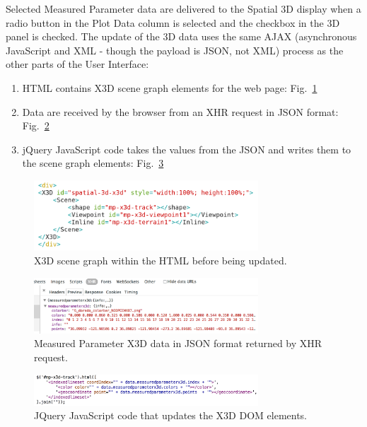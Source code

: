 \documentclass[conference]{IEEEtran}
\begin{document}
Selected Measured Parameter data are delivered to the Spatial 3D display when a radio button in the Plot Data column is selected and the checkbox in the 3D panel is checked. The update of the 3D data uses the same AJAX (asynchronous JavaScript and XML - though the payload is JSON, not XML) process as the other parts of the User Interface:

\begin{enumerate}
\item HTML contains X3D scene graph elements for the web page: Fig.~\ref{fig:Spatial3D_DOM}
\item Data are received by the browser from an XHR request in JSON format: Fig.~\ref{fig:JSONData}
\item jQuery JavaScript code takes the values from the JSON and writes them to the scene graph elements: Fig.~\ref{fig:jQueryDOMUpdateGeo}
\end{enumerate}

\begin{figure}[!htbp]
\centering
\includegraphics[width=3.3in]{Spatial3D_DOM.png}
\caption{X3D scene graph within the HTML before being updated.}
\label{fig:Spatial3D_DOM}
\end{figure}

\begin{figure}[!htbp]
\centering
\includegraphics[width=3.3in]{JSONData.png}
\caption{Measured Parameter X3D data in JSON format returned by XHR request.}
\label{fig:JSONData}
\end{figure}

\begin{figure}[!htbp]
\centering
\includegraphics[width=3.3in]{jQueryDOMUpdateGeo.png}
\caption{JQuery JavaScript code that updates the X3D DOM elements.}
\label{fig:jQueryDOMUpdateGeo}
\end{figure}
\end{document}

